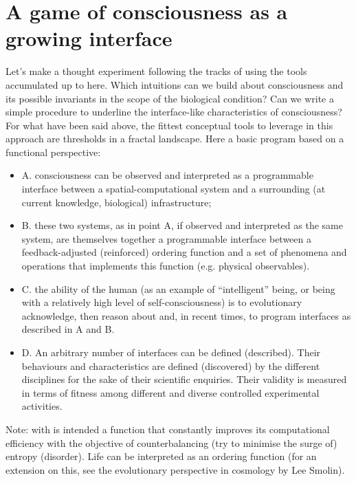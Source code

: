 \documentclass[14pt]{extarticle}
\begin{document}
\section*{A game of consciousness as a growing interface}
\label{sec:consciousness}


\hspace*{15mm}Let’s make a thought experiment following the tracks of \cite{hofstadter1981mind,hofstadter2000godel} using the tools accumulated up to here. Which intuitions can we build about consciousness and its possible invariants in the scope of the biological condition? Can we write a simple procedure to underline the interface-like characteristics of consciousness? For what have been said above, the fittest conceptual tools to leverage in this approach are thresholds in a fractal landscape. Here a basic program based on a functional perspective: 
\begin{itemize}
\item A. consciousness can be observed  and interpreted as a programmable interface between a spatial-computational system and a surrounding (at current knowledge, biological) infrastructure;
\item B. these two systems, as in point A, if observed and interpreted as the same system, are themselves together a programmable interface between a feedback-adjusted (reinforced) ordering function and a set of phenomena and operations that implements this function (e.g. physical observables).
\item C. the ability of the human (as an example of “intelligent” being, or being with a relatively high level of self-consciousness) is to evolutionary acknowledge, then reason about and, in recent times, to program interfaces as described in A and B.
\item D. An arbitrary number of interfaces can be defined (described). Their behaviours and characteristics are defined (discovered) by the different disciplines for the sake of their scientific enquiries. Their validity is measured in terms of fitness among different and diverse controlled experimental activities.
\end{itemize}
Note: with  is intended a function that constantly improves its computational efficiency with the objective of counterbalancing (try to minimise the surge of) entropy (disorder). Life can be interpreted as an ordering function (for an extension on this, see the evolutionary perspective in cosmology by Lee Smolin).
\end{document}
